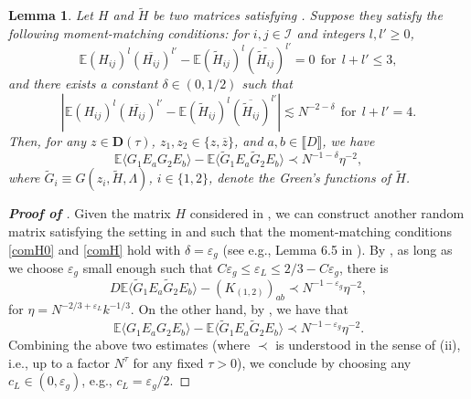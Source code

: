\documentclass[10pt,reqno]{amsart}
\numberwithin{equation}{section}
\numberwithin{figure}{section}
\theoremstyle{plain} %
\newtheorem{lemma}[theorem]{Lemma}
\theoremstyle{definition} %
\newcommand{\cal}{\mathcal}
\newcommand{\wt}{\widetilde}
\newcommand{\E}{\mathbb{E}}
\renewcommand{\bar}{\overline}
\newcommand{\be}{\begin{equation}}
\newcommand{\ee}{\end{equation}}
\newcommand{\e}{{\varepsilon}}
\newcommand{\kk}{l'}
\numberwithin{equation}{section}
\begin{document}
\begin{lemma}\label{main_lemma_com}
Let $H$ and $\wt H$ be two matrices satisfying . Suppose they satisfy the following moment-matching conditions: for $i,j\in \cal I$ and integers $l,\kk\ge 0$,  
\be\label{comH0}
\E (H_{ij})^l (\overline{H_{ij}})^{\kk} - \E (\wt H_{ij})^l (\overline{\wt H_{ij}})^{\kk}=0 \ \ \text{for} \ \ l+\kk\le 3, 
\ee
and there exists a constant $\delta \in (0,1/2)$ such that 
\be\label{comH}
\left|\E (H_{ij})^l (\overline{H_{ij}})^{\kk} - \E (\wt H_{ij})^l (\overline{\wt H_{ij}})^{\kk}\right| \lesssim N^{-2-\delta}  \ \ \text{for} \ \ l+\kk= 4. 
\ee
Then, for any $z\in \mathbf D(\tau)$, $z_1,z_2\in \{z, \bar z\}$, and $a,b \in \llbracket D\rrbracket$, we have
\be\label{eq:cpmparison}
\mathbb E \langle G_1E_{a}G_2E_{b}\rangle-\mathbb E \langle \wt G_1E_{a}\wt G_2E_{b}\rangle\prec N^{-1-\delta}\eta^{-2},
\ee
where $\wt G_i \equiv G(z_i,\wt H,\Lambda)$, $i\in \{1,2\}$, denote the Green's functions of $\wt H$.
\end{lemma}


\begin{proof}[\bf Proof of ]
     Given the matrix $H$ considered in , we can construct another random matrix \smash{$\wt H$} satisfying the setting in  and such that the moment-matching conditions \eqref{comH0} and \eqref{comH} hold with $\delta=\e_g$ (see e.g., Lemma 6.5 in \cite{erdHos2012bulk}).  
     By , as long as we choose $\e_g$ small enough such that $C\e_g \le \varepsilon_L \le 2/3-C\e_g$, there is 
     $$D\mathbb E \langle \wt G_1E_{a}\wt G_2E_{b}\rangle- (K_{(1,2)})_{ab}
     \prec N^{-1-\e_g}\eta^{-2},$$
     for $\eta = N^{-2/3+ \varepsilon_L} k^{-1/3}$. On the other hand, by , we have that 
     $$\mathbb E \langle  G_1E_{a} G_2E_{b}\rangle- \mathbb E \langle \wt G_1E_{a}\wt G_2E_{b}\rangle \prec N^{-1-\e_g}\eta^{-2}.$$
     Combining the above two estimates (where $\prec$ is understood in the sense of  (ii), i.e., up to a factor $N^{\tau}$ for any fixed $\tau>0$), we conclude  by choosing any $c_L\in(0,\e_g)$, e.g., $c_L=\e_g/2$.
\end{proof}
\end{document}
